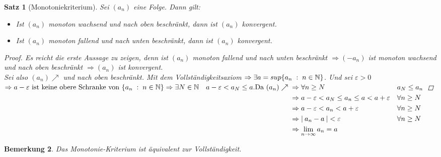 \documentclass[a4paper,titlepage,oneside]{article}
\def\N{\ensuremath{\mathbb{N}} }
\renewcommand{\epsilon}{\ensuremath{\varepsilon} }
\def\sp{\hspace{0,1cm}}
\renewcommand{\liminf}[2][n]{\ensuremath{\lim\limits_{#1 \rightarrow \infty}{#2}}}
\newcommand{\abs}[1]{\ensuremath{\left|\:#1\:\right|}}
\newcommand{\menge}[2]{\ensuremath{\{#1\sp : \sp #2\}}}
\theoremstyle{thmstyle}
\newtheorem{satz}{Satz}[subsection]
\newtheorem{bem}[satz]{Bemerkung}
\begin{document}
\begin{satz}[Monotoniekriterium]
Sei $(a_n)$ eine Folge. Dann gilt:
\begin{itemize}
\item Ist $(a_n)$ monoton wachsend und nach oben beschränkt, dann ist $(a_n)$ konvergent.
\item Ist $(a_n)$ monoton fallend  und nach unten beschränkt, dann ist $(a_n)$ konvergent.
\end{itemize}
\begin{proof}
Es reicht die erste Aussage zu zeigen, denn ist $(a_n)$ monoton fallend und nach unten beschränkt \( \Rightarrow (-a_n)\) ist monoton wachsend und nach oben beschränkt $\Rightarrow (a_n) $ ist konvergent.\\
Sei also \((a_n) \nearrow \) und nach oben beschränkt. Mit dem Vollständigkeitsaxiom \(\Rightarrow \exists a = sup\menge{a_n}{n \in \N}\). Und sei $\epsilon > 0$
\begin{math}
\Rightarrow a - \epsilon \text{ ist keine obere Schranke von } \menge{a_n}{n \in \N} \Rightarrow \exists N \in \N \quad a-\epsilon < a_N \le a.\\
\text{Da }(a_n) \nearrow \begin{aligned}[t]
					&\Rightarrow \forall n \ge N 						&& a_N \le a_n \\
					&\Rightarrow a-\epsilon < a_N \le a_n \le a < a+\epsilon 	&& \forall n \ge N \\
					&\Rightarrow a-\epsilon < a_n < a+\epsilon 			&& \forall n \ge N \\
					&\Rightarrow \abs{a_n - a} < \epsilon					&& \forall n \ge N \\
					&\Rightarrow \liminf{a_n} = a \end{aligned}\end{math}
\end{proof}
\end{satz}

\begin{bem}
Das Monotonie-Kriterium ist äquivalent zur Vollständigkeit.
\end{bem}
\end{document}
